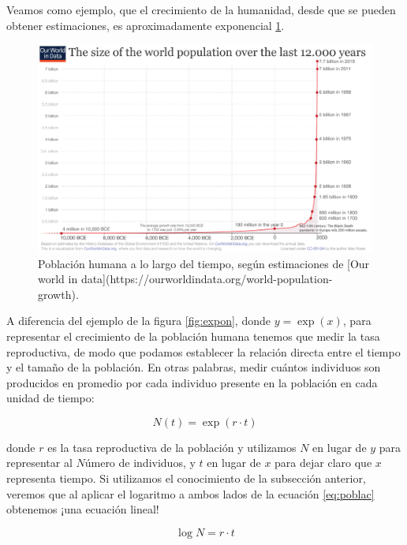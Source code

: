 \documentclass[
]{book}
\begin{document}
Veamos como ejemplo, que el crecimiento de la humanidad, desde que se pueden obtener estimaciones, es aproximadamente exponencial \ref{fig:popn-wd}.

\begin{figure}

{\centering \includegraphics[width=38.22in]{Unidad-II/popn} 

}

\caption{Población humana a lo largo del tiempo, según estimaciones de [Our world in data](https://ourworldindata.org/world-population-growth).}\label{fig:popn-wd}
\end{figure}

A diferencia del ejemplo de la figura \ref{fig:expon}, donde \(y = \exp(x)\), para representar el crecimiento de la población humana tenemos que medir la tasa reproductiva, de modo que podamos establecer la relación directa entre el tiempo y el tamaño de la población. En otras palabras, medir cuántos individuos son producidos en promedio por cada individuo presente en la población en cada unidad de tiempo:

\begin{equation}
N(t) = \exp(r \cdot t) \label{eq:poblac}
\end{equation}

donde \(r\) es la tasa reproductiva de la población y utilizamos \(N\) en lugar de \(y\) para representar al \(N\)úmero de individuos, y \(t\) en lugar de \(x\) para dejar claro que \(x\) representa tiempo. Si utilizamos el conocimiento de la subsección anterior, veremos que al aplicar el logaritmo a ambos lados de la ecuación \eqref{eq:poblac} obtenemos ¡una ecuación lineal!

\begin{equation}
    \log N = r \cdot t
\end{equation}
\end{document}
